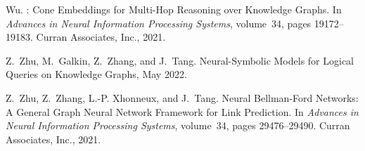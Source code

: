 \documentclass[11pt]{article}
\begin{document}
\begin{thebibliography}{10}
\begin{small}
Wu.
: {{Cone Embeddings}} for {{Multi-Hop Reasoning}} over
  {{Knowledge Graphs}}.
\newblock In {\em Advances in {{Neural Information Processing Systems}}},
  volume~34, pages 19172--19183. {Curran Associates, Inc.}, 2021.

Z.~Zhu, M.~Galkin, Z.~Zhang, and J.~Tang.
\newblock Neural-{{Symbolic Models}} for {{Logical Queries}} on {{Knowledge
  Graphs}}, May 2022.

Z.~Zhu, Z.~Zhang, L.-P. Xhonneux, and J.~Tang.
\newblock Neural {{Bellman-Ford Networks}}: {{A General Graph Neural Network
  Framework}} for {{Link Prediction}}.
\newblock In {\em Advances in {{Neural Information Processing Systems}}},
  volume~34, pages 29476--29490. {Curran Associates, Inc.}, 2021.



\end{small}
\end{thebibliography}
\end{document}
